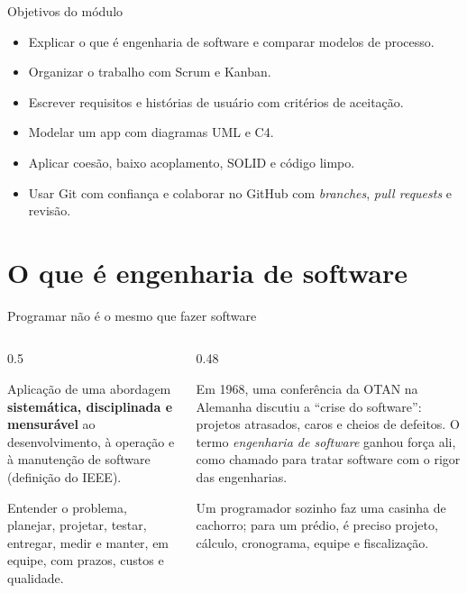 \documentclass[aspectratio=169,10pt]{beamer}
\begin{document}
\capa

\begin{frame}{Objetivos do módulo}
  \begin{conceito}
    \begin{itemize}
      \item Explicar o que é engenharia de software e comparar modelos de processo.
      \item Organizar o trabalho com Scrum e Kanban.
      \item Escrever requisitos e histórias de usuário com critérios de aceitação.
      \item Modelar um app com diagramas UML e C4.
      \item Aplicar coesão, baixo acoplamento, SOLID e código limpo.
      \item Usar Git com confiança e colaborar no GitHub com \emph{branches}, \emph{pull requests} e revisão.
    \end{itemize}
  \end{conceito}
\end{frame}

\sumario

\section{O que é engenharia de software}

\begin{frame}{Programar não é o mesmo que fazer software}
  \begin{columns}[T]
    \begin{column}{0.5\textwidth}
      \begin{definicao}
        Aplicação de uma abordagem \textbf{sistemática, disciplinada e mensurável} ao desenvolvimento, à operação e à manutenção de software (definição do IEEE).
      \end{definicao}
      \begin{conceito}
        Entender o problema, planejar, projetar, testar, entregar, medir e manter, em equipe, com prazos, custos e qualidade.
      \end{conceito}
    \end{column}
    \begin{column}{0.48\textwidth}
      \begin{historia}
        Em 1968, uma conferência da OTAN na Alemanha discutiu a ``crise do software'': projetos atrasados, caros e cheios de defeitos. O termo \emph{engenharia de software} ganhou força ali, como chamado para tratar software com o rigor das engenharias.
      \end{historia}
      \begin{analogia}
        Um programador sozinho faz uma casinha de cachorro; para um prédio, é preciso projeto, cálculo, cronograma, equipe e fiscalização.
      \end{analogia}
    \end{column}
  \end{columns}
\end{frame}
\end{document}
